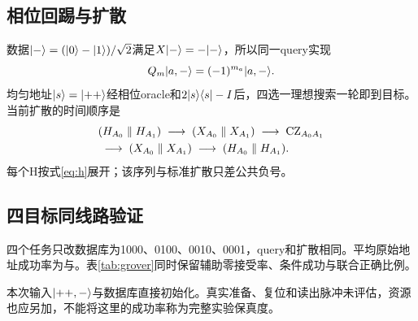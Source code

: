 \subsection{相位回踢与扩散}
数据$\lvert -\rangle=(\lvert 0\rangle-\lvert 1\rangle)/\sqrt2$满足$X\lvert -\rangle=-\lvert -\rangle$，所以同一query实现
\begin{equation}
 Q_m\lvert a,-\rangle=(-1)^{m_a}\lvert a,-\rangle.
\end{equation}
均匀地址$\lvert s\rangle=\lvert ++\rangle$经相位oracle和$2\lvert s\rangle\langle s\rvert-I$后，四选一理想搜索一轮即到目标。当前扩散的时间顺序是
\begin{equation}\label{eq:diffusion}
\begin{aligned}
 &(H_{A_0}\parallel H_{A_1})\;\longrightarrow\;(X_{A_0}\parallel X_{A_1})\;\longrightarrow\;\mathrm{CZ}_{A_0A_1}\\
 &\;\longrightarrow\;(X_{A_0}\parallel X_{A_1})\;\longrightarrow\;(H_{A_0}\parallel H_{A_1}).
\end{aligned}
\end{equation}
每个H按式\eqref{eq:h}展开；该序列与标准扩散只差公共负号。

\subsection{四目标同线路验证}
四个任务只改数据库为1000、0100、0010、0001，query和扩散相同。平均原始地址成功率为\RfiveGrover{}与\RsixGrover{}。表\ref{tab:grover}同时保留辅助零接受率、条件成功与联合正确比例。

本次输入$\lvert ++,-\rangle$与数据库直接初始化。真实准备、复位和读出脉冲未评估，资源也应另加，不能将这里的成功率称为完整实验保真度。
\FloatBarrier
